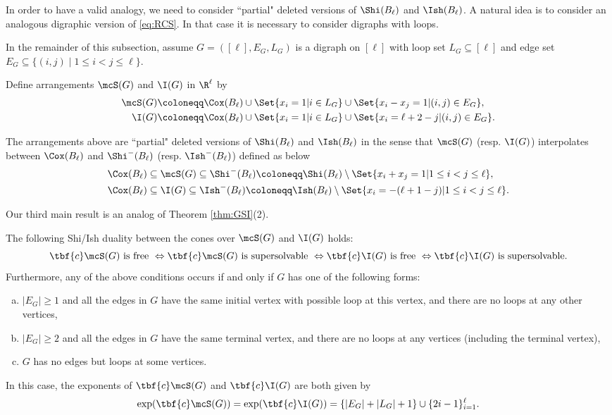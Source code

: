 In order to have a valid analogy, we need to consider ``partial" deleted versions of $ \Shi(B_\ell)$ and $ \Ish(B_\ell)$. 
A natural idea is to consider an analogous digraphic version of \eqref{eq:RCS}.
In that case it is necessary to consider digraphs with loops.

In the remainder of this subsection, assume $G=([\ell],E_G,L_G)$ is a digraph on $[\ell]$ with loop set $L_G\subseteq[\ell]$ and edge set $E_G \subseteq \{(i,j) \mid 1 \leq i < j \leq \ell\}$. 
\begin{definition}
\label{def:Del-SI}
Define arrangements $\mcS(G)$
 and $\I(G)$ in $\R^\ell$ by
\begin{align*}
\mcS(G) & \coloneqq \Cox(B_\ell)  \cup  \Set{ x_{i} = 1 | i \in L_G} \cup  \Set{ x_{i}-x_{j}= 1 | (i,j) \in E_G}, \\
\I(G) & \coloneqq \Cox(B_\ell)  \cup  \Set{ x_{i} = 1 | i \in L_G} \cup  \Set{ x_{i} = \ell+2-j | (i,j) \in E_G}.
\end{align*}
\end{definition}

The arrangements above are ``partial" deleted versions of $ \Shi(B_\ell)$ and $ \Ish(B_\ell)$ in the sense that 
$\mcS(G)$ (resp. $ \I(G) $) interpolates between $\Cox(B_\ell)$ and  $\Shi^-(B_\ell)$ (resp. $\Ish^-(B_\ell)$) defined as below
\begin{align*}
 & \Cox(B_\ell) \subseteq  \mcS(G)   \subseteq \Shi^-(B_\ell) \coloneqq \Shi(B_\ell) \setminus \Set{ x_{i}+ x_{j}= 1 | 1 \leq i < j \leq \ell}, \\
 & \Cox(B_\ell) \subseteq \I(G)   \subseteq \Ish^-(B_\ell) \coloneqq \Ish(B_\ell)  \setminus \Set{ x_{i} =  -(\ell+1-j )| 1 \leq i < j \leq \ell}.
\end{align*}

Our third main result is an analog of Theorem \ref{thm:GSI}(2). 
\begin{theorem}
 \label{thm:SI-sym-G}
The following Shi/Ish duality between the cones over $\mcS(G)$ and $\I(G)$ holds:
$$\tbf{c} \mcS(G) \text{ is free } \Leftrightarrow \tbf{c}\mcS(G) \text{ is supersolvable } \Leftrightarrow \tbf{c} \I(G) \text{ is free } \Leftrightarrow \tbf{c}\I(G) \text{ is supersolvable}.$$
Furthermore, any of the above conditions occurs if and only if $G$ has one of the following forms: 
 \begin{enumerate}[(a)]
\item $|E_G|\ge1$ and  all the edges in $G$ have the same initial vertex with possible loop at this vertex, and there are no loops at any other vertices, 
\item $|E_G|\ge2$ and all the edges in $G$ have the same terminal vertex, and there are no loops at any vertices (including  the terminal vertex),
\item $G$ has no edges but loops at some vertices. 
\end{enumerate}
In this case, the exponents of  $\tbf{c} \mcS(G)$ and $\tbf{c}\I(G)$ are both given by 
$$\exp(\tbf{c} \mcS(G)) = \exp(\tbf{c}\I(G)) = \{|E_G|+|L_G|+1\} \cup \{2i-1\}_{i=1}^\ell.$$
 \end{theorem} 
 

